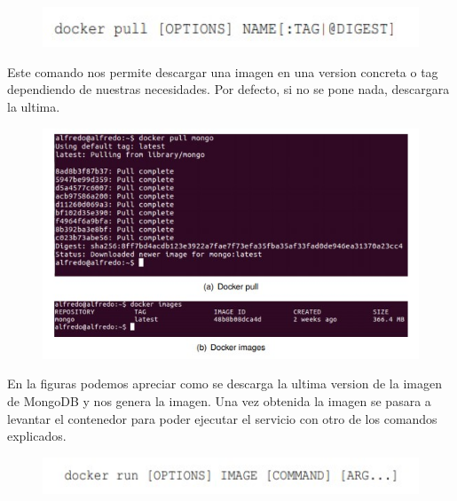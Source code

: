 \documentclass[preprint,12pt]{elsarticle}
\begin{document}
\begin{figure}[htb]
	\begin{center}
		\includegraphics[width=14cm]{./IMAGENES/foto3} 
		
	\end{center}
\end{figure}

Este comando nos permite descargar una imagen en una version concreta o tag dependiendo de nuestras necesidades. Por defecto, si no se pone nada, descargara la ultima.

\begin{figure}[htb]
	\begin{center}
		\includegraphics[width=14cm]{./IMAGENES/foto4}
		
	\end{center}
\end{figure}

En la figuras podemos apreciar como se descarga la ultima version de la imagen de MongoDB y nos genera la imagen.
Una vez obtenida la imagen se pasara a levantar el contenedor para poder ejecutar el servicio con otro de los comandos explicados.


\begin{figure}[htb]
	\begin{center}
		\includegraphics[width=14cm]{./IMAGENES/foto5}
		
	\end{center}
\end{figure}
\end{document}

